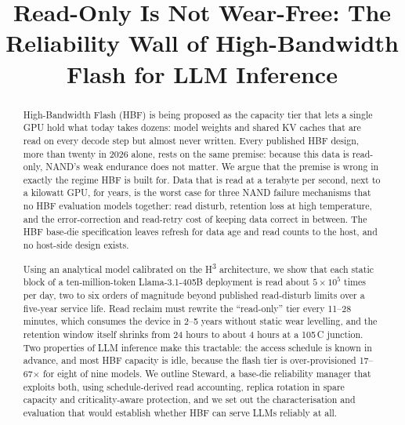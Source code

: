 \documentclass[conference,10pt]{IEEEtran}
\newcommand{\Hthree}{H\textsuperscript{3}}
\newcommand{\sys}{Steward}
\begin{document}
\title{Read-Only Is Not Wear-Free: The Reliability Wall of High-Bandwidth
Flash for LLM Inference}

\author{
\and
{}
}

\maketitle

\begin{abstract}
High-Bandwidth Flash (HBF) is being proposed as the capacity tier that lets a
single GPU hold what today takes dozens: model weights and shared KV caches
that are read on every decode step but almost never written. Every published
HBF design, more than twenty in 2026 alone, rests on the same premise:
because this data is read-only, NAND's weak endurance does not matter. We
argue that the premise is wrong in exactly the regime HBF is built for. Data
that is read at a terabyte per second, next to a kilowatt GPU, for years, is
the worst case for three NAND failure mechanisms that no HBF evaluation
models together: read disturb, retention loss at high temperature, and the
error-correction and read-retry cost of keeping data correct in between. The
HBF base-die specification leaves refresh for data age and read counts to the
host, and no host-side design exists.

Using an analytical model calibrated on the \Hthree{} architecture, we show
that each static block of a ten-million-token Llama-3.1-405B deployment is
read about $5\times10^{5}$ times per day, two to six orders of magnitude
beyond published read-disturb limits over a five-year service life. Read
reclaim must rewrite the ``read-only'' tier every 11--28 minutes, which
consumes the device in 2--5 years without static wear levelling, and the
retention window itself shrinks from 24 hours to about 4 hours at a 105\,\textdegree{}C
junction. Two properties of LLM inference make this tractable: the access
schedule is known in advance, and most HBF capacity is idle, because the flash
tier is over-provisioned 17--67$\times$ for eight of nine models. We outline
\sys{}, a base-die reliability manager that exploits both, using
schedule-derived read accounting, replica rotation in spare capacity and
criticality-aware protection, and we set out the characterisation and
evaluation that would establish whether HBF can serve LLMs reliably at all.
\end{abstract}
\end{document}
